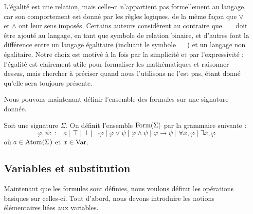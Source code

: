 \begin{remark}
  L'égalité est une relation, mais celle-ci n'appartient pas formellement au
  langage, car son comportement est donné par les règles logiques, de la même
  façon que $\lor$ et $\land$ ont leur sens imposés. Certains auteurs
  considèrent au contraire que $=$ doit être ajouté au langage, en tant que
  symbole de relation binaire, et d'autres font la différence entre un langage
  égalitaire (incluant le symbole $=$) et un langage non égalitaire. Notre choix
  est motivé à la fois par la simplicité et par l'expressivité : l'égalité est
  clairement utile pour formaliser les mathématiques et raisonner dessus, mais
  chercher à préciser quand nous l'utilisons ne l'est pas, étant donné qu'elle
  sera toujours présente.
\end{remark}

Nous pouvons maintenant définir l'ensemble des formules sur une signature
donnée.

\begin{definition}[Formules]
  Soit une signature $\Sigma$. On définit l'ensemble $\operatorname{Form}(\Sigma)$ par
  la grammaire suivante :
  \[\varphi,\psi ::= a\mid \top\mid\bot\mid\lnot\varphi\mid\varphi\lor\psi\mid
  \varphi\land\psi\mid \varphi\to\psi\mid\forall x,\varphi\mid
  \exists x,\varphi\]
  où $a\in \operatorname{Atom}(\Sigma)$ et $x\in \operatorname{Var}$.
\end{definition}

\subsection{Variables et substitution}

Maintenant que les formules sont définies, nous voulons définir les opérations
basiques sur celles-ci. Tout d'abord, nous devons introduire les notions
élémentaires liées aux variables.

